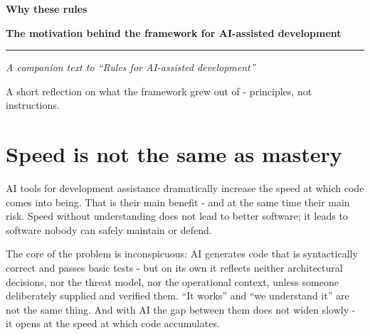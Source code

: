

\renewcommand{\versionline}{companion text}
\renewcommand{\doctitle}{Why these rules — the motivation behind the framework}



\thispagestyle{empty}
\vspace*{3cm}
{\sffamily\fontsize{30}{34}\selectfont\bfseries\color{navy}Why these rules\par}
\vspace{4pt}
{\sffamily\Large\bfseries\color{blue}The motivation behind the framework for AI-assisted development\par}
\vspace{10pt}
{\color{blue}\rule{\linewidth}{1.5pt}}\par
\vspace{12pt}
{\sffamily\large\itshape\color{black!55}A companion text to \enquote{Rules for AI-assisted development}\par}
\vspace{20pt}
{\sffamily\small\color{black!50}
A short reflection on what the framework grew out of - principles, not instructions.\par}
\vfill
\newpage

\section{Speed is not the same as mastery}

AI tools for development assistance dramatically increase the speed at which code comes into being.
That is their main benefit - and at the same time their main risk.
Speed without understanding does not lead to better software; it leads to software nobody can safely maintain or defend.

The core of the problem is inconspicuous: AI generates code that is syntactically correct and passes basic tests - but on its own it reflects neither architectural decisions, nor the threat model, nor the operational context, unless someone deliberately supplied and verified them.
\enquote{It works} and \enquote{we understand it} are not the same thing.
And with AI the gap between them does not widen slowly - it opens at the speed at which code accumulates.

